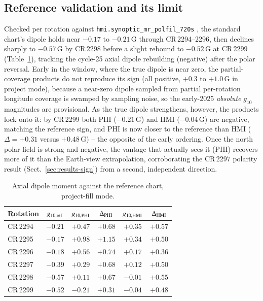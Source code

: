 \documentclass{aa}
\begin{document}
\subsection{Reference validation and its limit}
\label{sec:results-reference}

Checked per rotation against \texttt{hmi.synoptic\_mr\_polfil\_720s} \citep{Sun2018}, the standard chart's dipole holds near $-0.17$ to $-0.21$\,G through CR\,2294--2296, then declines sharply to $-0.57$\,G by CR\,2298 before a slight rebound to $-0.52$\,G at CR\,2299 (Table~\ref{tab:reference}), tracking the cycle-25 axial dipole rebuilding (negative) after the polar reversal. Early in the window, where the true dipole is near zero, the partial-coverage products do not reproduce its sign (all positive, $+0.3$ to $+1.0$\,G in project mode), because a near-zero dipole sampled from partial per-rotation longitude coverage is swamped by sampling noise, so the early-2025 \emph{absolute} $g_{10}$ magnitudes are provisional. As the true dipole strengthens, however, the products lock onto it: by CR\,2299 both PHI ($-0.21$\,G) and HMI ($-0.04$\,G) are negative, matching the reference sign, and PHI is now closer to the reference than HMI ($\Delta = +0.31$ versus $+0.48$\,G) -- the opposite of the early ordering. Once the north polar field is strong and negative, the vantage that actually sees it (PHI) recovers more of it than the Earth-view extrapolation, corroborating the CR\,2297 polarity result (Sect.~\ref{sec:results-sign}) from a second, independent direction.

\begin{table}
\caption{Axial dipole moment against the reference chart, project-fill mode.}
\label{tab:reference}
\centering
\footnotesize
\begin{tabular}{lccccc}
\hline\hline
Rotation & $g_{10,\rm ref}$ & $g_{10,\rm PHI}$ & $\Delta_{\rm PHI}$ & $g_{10,\rm HMI}$ & $\Delta_{\rm HMI}$ \\
\hline
CR\,2294 & $-0.21$ & $+0.47$ & $+0.68$ & $+0.35$ & $+0.57$ \\
CR\,2295 & $-0.17$ & $+0.98$ & $+1.15$ & $+0.34$ & $+0.50$ \\
CR\,2296 & $-0.18$ & $+0.56$ & $+0.74$ & $+0.17$ & $+0.36$ \\
CR\,2297 & $-0.39$ & $+0.29$ & $+0.68$ & $+0.12$ & $+0.50$ \\
CR\,2298 & $-0.57$ & $+0.11$ & $+0.67$ & $-0.01$ & $+0.55$ \\
CR\,2299 & $-0.52$ & $-0.21$ & $+0.31$ & $-0.04$ & $+0.48$ \\
\hline
\end{tabular}
\end{table}
\end{document}
